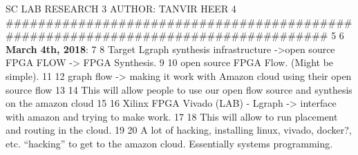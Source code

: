SC LAB RESEARCH
  3 AUTHOR: TANVIR HEER
  4 ###################################################################################
  5 
  6 \textbf{March 4th, 2018}:
  7 
  8 Target Lgraph synthesis infrastructure ->open source FPGA FLOW -> FPGA Synthesis.
  9 
 10 open source FPGA Flow. (Might be simple).
 11 
 12 graph flow -> making it work with Amazon cloud using their open source flow
 13 
 14 This will allow people to use our open flow source and synthesis on the amazon cloud
 15 
 16 Xilinx FPGA Vivado (LAB) - Lgraph -> interface with amazon and trying to make work.
 17 
 18 This will allow to run placement and routing in the cloud.
 19 
 20 A lot of hacking, installing linux, vivado, docker?, etc. “hacking” to get to the amazon cloud. Essentially systems programming.
